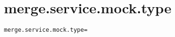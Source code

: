\section{merge.service.mock.type}
\label{configuration:MergeServiceMockType}
\ClearAPI
\TODO
\begin{lstlisting}[style=Props,caption={Usage example for \textit{merge.service.mock.type}}]
merge.service.mock.type=
\end{lstlisting}